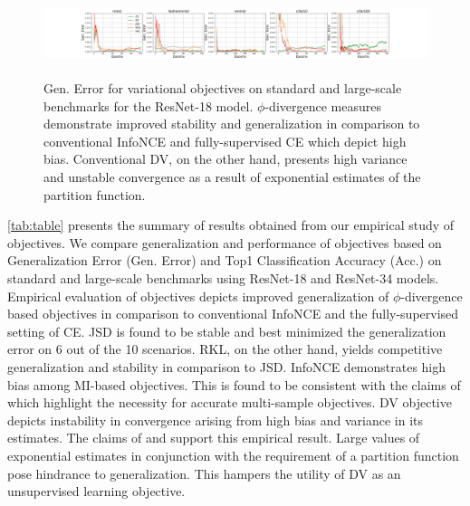 \documentclass{article}
\begin{document}
\begin{figure}[ht]
\centering
  \includegraphics[height=2.5cm,width=14cm]{18_gen_error.png}
  \caption{Gen. Error for variational objectives on standard and large-scale benchmarks for the ResNet-18 model. $\phi$-divergence measures demonstrate improved stability and generalization in comparison to conventional InfoNCE and fully-supervised CE which depict high bias. Conventional DV, on the other hand, presents high variance and unstable convergence as a result of exponential estimates of the partition function.}
  \label{fig:plot}
\end{figure}
\autoref{tab:table} presents the summary of results obtained from our empirical study of objectives. We compare generalization and performance of objectives based on Generalization Error (Gen. Error) and Top1 Classification Accuracy (Acc.) on standard and large-scale benchmarks using ResNet-18 and ResNet-34 models. Empirical evaluation of objectives depicts improved generalization of $\phi$-divergence based objectives in comparison to conventional InfoNCE and the fully-supervised setting of CE. JSD is found to be stable and best minimized the generalization error on 6 out of the 10 scenarios. RKL, on the other hand, yields competitive generalization and stability in comparison to JSD. InfoNCE demonstrates high bias among MI-based objectives. This is found to be consistent with the claims of \cite{variational} which highlight the necessity for accurate multi-sample objectives. DV objective depicts instability in convergence arising from high bias and variance in its estimates. The claims of \cite{variational} and \cite{infomax} support this empirical result. Large values of exponential estimates in conjunction with the requirement of a partition function pose hindrance to generalization. This hampers the utility of DV as an unsupervised learning objective. 
\end{document}
